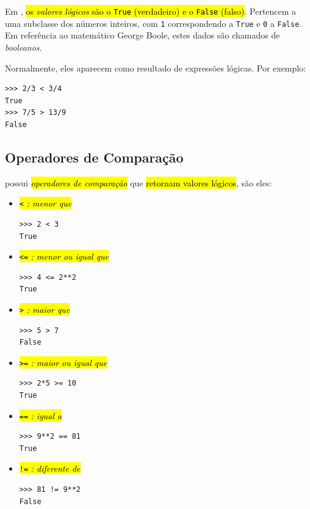 Em {\python}, \hl{os \emph{valores lógicos} são o {\lstinline+True+} (verdadeiro) e o {\lstinline+False+} (falso)}. Pertencem a uma subclasse dos números inteiros, com \lstinline+1+ correspondendo a \lstinline+True+ e \lstinline+0+ a \lstinline+False+. Em referência ao matemático George Boole{\boole}, estes dados são chamados de \emph{booleanos}.

Normalmente, eles aparecem como resultado de expressões lógicas. Por exemplo:
\begin{lstlisting}
>>> 2/3 < 3/4
True
>>> 7/5 > 13/9
False
\end{lstlisting}

\subsection{Operadores de Comparação}

{\python} possui \hl{\emph{operadores de comparação}} que \hl{retornam valores lógicos}, são eles:
\begin{itemize}
\item \hl{{\lstinline+<+} \emph{: menor que}}

\begin{lstlisting}
>>> 2 < 3
True
\end{lstlisting}

\item \hl{{\lstinline+<=+} \emph{: menor ou igual que}}

\begin{lstlisting}
>>> 4 <= 2**2
True
\end{lstlisting}

\item \hl{{\lstinline+>+} \emph{: maior que}}

\begin{lstlisting}
>>> 5 > 7
False
\end{lstlisting}

\item \hl{{\lstinline+>=+} \emph{: maior ou igual que}}

\begin{lstlisting}
>>> 2*5 >= 10
True
\end{lstlisting}

\item \hl{{\lstinline+==+} \emph{: igual a}}

\begin{lstlisting}
>>> 9**2 == 81
True
\end{lstlisting}

\item \hl{{\lstinline+!=+} \emph{: diferente de}}

\begin{lstlisting}
>>> 81 != 9**2
False
\end{lstlisting}
\end{itemize}

